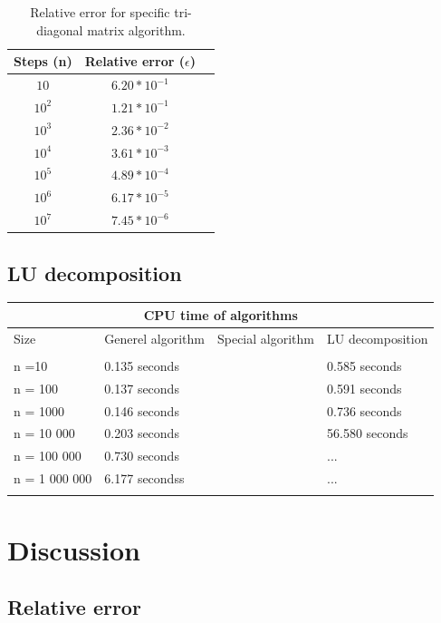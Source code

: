 \documentclass[norsk,a4paper,12pt]{article}
\begin{document}
  \begin{table}[h!]
\begin{center}
\caption{Relative error for specific tri-diagonal matrix algorithm.}
\begin{tabular}{ |c|c|c| } \hline
Steps (n)&Relative error ($\epsilon$) \\ \hline
$10$&$6.20*10^{-1}$ \\ \hline
$10^2$&$1.21*10^{-1}$ \\ \hline
$10^3$&$2.36*10^{-2}$ \\ \hline
$10^4$&$3.61*10^{-3}$ \\ \hline
$10^5$&$4.89*10^{-4}$ \\ \hline
$10^6$&$6.17*10^{-5}$ \\ \hline
$10^7$&$7.45*10^{-6}$ \\ \hline
\end{tabular}
\label{tab:e}
\end{center}
\end{table}

 \subsection{LU decomposition}
 
 \begin{tabular}{ |p{3.5cm}||p{3.5cm}|p{3.5cm}|p{3.5cm}|  }
 \hline
 \multicolumn{4}{|c|}{CPU time of algorithms} \\
 \hline
Size & Generel algorithm& Special algorithm& LU decomposition \\ \\
 \hline
 n =10 & 0.135 seconds & &0.585 seconds\\
n = 100 & 0.137 seconds   &  & 0.591 seconds\\
n = 1000 &0.146 seconds &  & 0.736 seconds\\
n = 10 000    &0.203 seconds&  &56.580 seconds\\
n = 100 000& 0.730 seconds & & ...\\
n = 1 000 000 & 6.177 secondss &    &...\\
 &  &  &\\
 \hline
\end{tabular}
 
\section{Discussion}

\subsection{Relative error}
 
\end{document}
